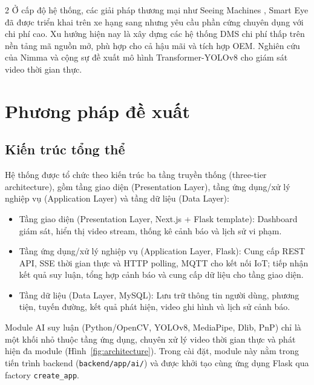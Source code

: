 \documentclass[10pt]{article}
\begin{document}
\begin{multicols}{2}
Ở cấp độ hệ thống, các giải pháp thương mại như Seeing Machines \cite{seeingmachines2022}, Smart Eye đã được triển khai trên xe hạng sang nhưng yêu cầu phần cứng chuyên dụng với chi phí cao. Xu hướng hiện nay là xây dựng các hệ thống DMS chi phí thấp trên nền tảng mã nguồn mở, phù hợp cho cả hậu mãi và tích hợp OEM. Nghiên cứu của Nimma và cộng sự \cite{nimma2025} đề xuất mô hình Transformer-YOLOv8 cho giám sát video thời gian thực.

\section{Phương pháp đề xuất}

\subsection{Kiến trúc tổng thể}

\begin{sloppypar}
Hệ thống được tổ chức theo kiến trúc ba tầng truyền thống (\mbox{three-tier} architecture), gồm tầng giao diện (\mbox{Presentation} Layer), tầng ứng dụng/xử lý nghiệp vụ (\mbox{Application} Layer) và tầng dữ liệu (Data Layer):
\end{sloppypar}

\begin{itemize}[leftmargin=*,nosep]
  \item Tầng giao diện (\mbox{Presentation} Layer, Next.js + Flask template): \mbox{Dashboard} giám sát, hiển thị video \mbox{stream}, thống kê cảnh báo và lịch sử vi phạm.
  \item Tầng ứng dụng/xử lý nghiệp vụ (\mbox{Application} Layer, Flask): Cung cấp REST API, SSE thời gian thực và HTTP \mbox{polling}, MQTT cho kết nối IoT; tiếp nhận kết quả suy luận, tổng hợp cảnh báo và cung cấp dữ liệu cho tầng giao diện.
  \item Tầng dữ liệu (Data Layer, MySQL): Lưu trữ thông tin người dùng, phương tiện, tuyến đường, kết quả phát hiện, video ghi hình và lịch sử cảnh báo.
\end{itemize}

\begin{sloppypar}
Module AI suy luận (\mbox{Python/OpenCV}, YOLOv8, \mbox{MediaPipe}, Dlib, PnP) chỉ là một khối nhỏ thuộc tầng ứng dụng, chuyên xử lý video thời gian thực và phát hiện đa module (Hình~\ref{fig:architecture}). Trong cài đặt, module này nằm trong tiến trình \mbox{backend} ({\tt backend/app/ai/}) và được khởi tạo cùng ứng dụng Flask qua \mbox{factory} {\tt create\_app}.
\end{sloppypar}


\end{multicols}
\end{document}
